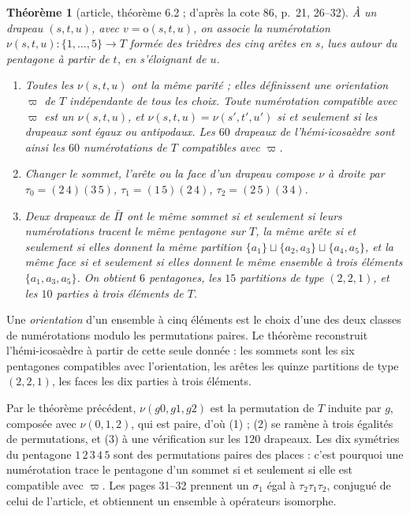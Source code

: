 \documentclass[11pt,a4paper]{amsart}
\theoremstyle{definition}
\theoremstyle{plain}
\newtheorem{theoreme}{Théorème}
\theoremstyle{remark}
\begin{document}
\begin{theoreme}[article, théorème 6.2 ; d'après la cote 86, p.~21, 26--32]
À un drapeau $(s, t, u)$, avec $v = \mathrm o(s, t, u)$, on associe la numérotation $\nu(s, t, u)\colon \{1, \dots, 5\} \to T$ formée des trièdres des cinq arêtes en $s$, lues autour du pentagone à partir de $t$, en s'éloignant de $u$.
\begin{enumerate}
\item Toutes les $\nu(s, t, u)$ ont la même parité ; elles définissent une orientation $\varpi$ de $T$ indépendante de tous les choix. Toute numérotation compatible avec $\varpi$ est un $\nu(s, t, u)$, et $\nu(s, t, u) = \nu(s', t', u')$ si et seulement si les drapeaux sont égaux ou antipodaux. Les $60$ drapeaux de l'hémi-icosaèdre sont ainsi les $60$ numérotations de $T$ compatibles avec $\varpi$.
\item Changer le sommet, l'arête ou la face d'un drapeau compose $\nu$ à droite par $\tau_0 = (2\,4)(3\,5)$, $\tau_1 = (1\,5)(2\,4)$, $\tau_2 = (2\,5)(3\,4)$.
\item Deux drapeaux de $\bar\Pi$ ont le même sommet si et seulement si leurs numérotations tracent le même pentagone sur $T$, la même arête si et seulement si elles donnent la même partition $\{a_1\} \sqcup \{a_2, a_3\} \sqcup \{a_4, a_5\}$, et la même face si et seulement si elles donnent le même ensemble à trois éléments $\{a_1, a_3, a_5\}$. On obtient $6$ pentagones, les $15$ partitions de type $(2,2,1)$, et les $10$ parties à trois éléments de $T$.
\end{enumerate}
\end{theoreme}

Une \emph{orientation} d'un ensemble à cinq éléments est le choix d'une des deux classes de numérotations modulo les permutations paires. Le théorème reconstruit l'hémi-icosaèdre à partir de cette seule donnée : les sommets sont les six pentagones compatibles avec l'orientation, les arêtes les quinze partitions de type $(2,2,1)$, les faces les dix parties à trois éléments.

Par le théorème précédent, $\nu(g0, g1, g2)$ est la permutation de $T$ induite par $g$, composée avec $\nu(0, 1, 2)$, qui est paire, d'où (1) ; (2) se ramène à trois égalités de permutations, et (3) à une vérification sur les $120$ drapeaux. Les dix symétries du pentagone $1\,2\,3\,4\,5$ sont des permutations paires des places : c'est pourquoi une numérotation trace le pentagone d'un sommet si et seulement si elle est compatible avec $\varpi$. Les pages 31--32 prennent un $\sigma_1$ égal à $\tau_2\tau_1\tau_2$, conjugué de celui de l'article, et obtiennent un ensemble à opérateurs isomorphe.
\end{document}
